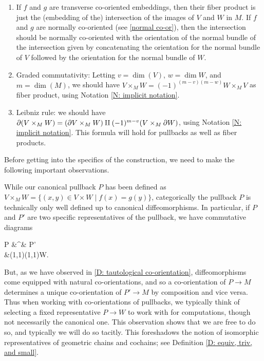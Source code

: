 \begin{enumerate}
	\item If $f$ and $g$ are transverse co-oriented embeddings, then their fiber product is just the (embedding of the) intersection of the images of $V$ and $W$ in $M$.
	If $f$ and $g$ are normally co-oriented (see \cref{normal co-or}), then the intersection should be normally co-oriented with the orientation of the normal bundle of the intersection given by concatenating the orientation for the normal bundle of $V$ followed by the orientation for the normal bundle of $W$.

	\item Graded commutativity: Letting $v = \dim(V)$, $w = \dim W$, and $m = \dim(M)$, we should have $V \times_M W = (-1)^{(m-v)(m-w)}W \times_M V$ as fiber product, using Notation \ref{N: implicit notation}.

	\item Leibniz rule: we should have $\partial (V \times_M W) = (\partial V \times_M W)\amalg (-1)^{m-v}(V \times_M \partial W)$, using Notation \ref{N: implicit notation}.
	This formula will hold for pullbacks as well as fiber products.
\end{enumerate}

Before getting into the specifics of the construction, we need to make the following important observations.

\begin{remark}\label{R: pullback representative}
	While our canonical pullback $P$ has been defined as $V \times_M W = \{(x,y) \in V \times W \mid f(x) = g(y)\}$, categorically the pullback $P$ is technically only well defined up to canonical diffeomorphisms.
	In particular, if $P$ and $P'$ are two specific representatives of the pullback, we have commutative diagrams
	\begin{diagram}[LaTeXeqno]\label{D: comm triangle}
		P &\rTo^\cong& P'\\
		&\rdTo(1,1)\ldTo(1,1)W.
	\end{diagram}
	But, as we have observed in \cref{D: tautological co-orientation}, diffeomorphisms come equipped with natural co-orientations, and so a co-orientation of $P \to M$ determines a unique co-orientation of $P' \to M$ by composition and vice versa.
	Thus when working with co-orientations of pullbacks, we typically think of selecting a fixed representative $P \to W$ to work with for computations, though not necessarily the canonical one.
	This observation shows that we are free to do so, and typically we will do so tacitly.
	This foreshadows the notion of isomorphic representatives of geometric chains and cochains; see Definition \ref{D: equiv, triv, and small}.
\end{remark}

